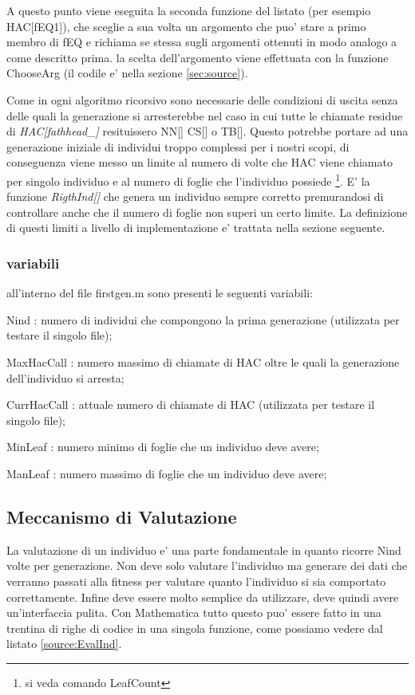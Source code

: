 \documentclass[12pt, a4paper]{article}
\begin{document}
A questo punto viene eseguita la seconda funzione del listato (per esempio HAC[fEQ1]), che sceglie a sua volta un argomento che puo' stare a primo membro di fEQ e richiama se stessa sugli argomenti ottenuti in modo analogo a come descritto prima. la scelta dell'argomento viene effettuata con la funzione ChooseArg (il codile e' nella sezione \ref{sec:source}).

Come in ogni algoritmo ricorsivo sono necessarie delle condizioni di uscita senza delle quali la generazione si arresterebbe nel caso in cui tutte le chiamate residue di {\itshape HAC[fathhead\_]} resituissero NN[] CS[] o TB[]. Questo potrebbe portare ad una generazione iniziale di individui troppo complessi per i nostri scopi, di conseguenza viene messo un limite al numero di volte che HAC viene chiamato per singolo individuo e al numero di foglie che l'individuo possiede \footnote{si veda comando LeafCount}.
E' la funzione {\itshape RigthInd[]} che genera un individuo sempre corretto premurandosi di controllare anche che il numero di foglie non superi un certo limite.
La definizione di questi limiti a livello di implementazione e' trattata nella sezione seguente.

\subsubsection{variabili}
all'interno del file firstgen.m sono presenti le seguenti variabili:
\begin{description}
	\item{Nind : } numero di individui che compongono la prima generazione (utilizzata per testare il singolo file);
	\item{MaxHacCall : } numero massimo di chiamate di HAC oltre le quali la generazione dell'individuo si arresta;
	\item{CurrHacCall : } attuale numero di chiamate di HAC (utilizzata per testare il singolo file);
	\item{MinLeaf : } numero minimo di foglie che un individuo deve avere;
	\item{ManLeaf : } numero massimo di foglie che un individuo deve avere;
\end{description}

\lstset{caption=la funzione HAC per la generazione ricorsiva degli individui,
		label=source:HAC}



\subsection{Meccanismo di Valutazione}
\label{sec:valmec}
La valutazione di un individuo e' una parte fondamentale in quanto ricorre Nind volte per generazione. Non deve solo valutare l'individuo ma generare dei dati che verranno passati alla fitness per valutare quanto l'individuo si sia comportato correttamente. Infine deve essere molto semplice da utilizzare, deve quindi avere un'interfaccia pulita. Con Mathematica tutto questo puo' essere fatto in una trentina di righe di codice in una singola funzione, come possiamo vedere dal listato \ref{source:EvalInd}.
\end{document}
